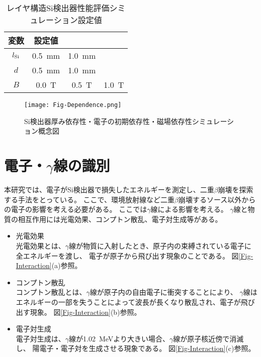 \documentclass[a4paper,10pt]{jreport}
\begin{document}
\begin{table}[H] 
	\center
	\caption{レイヤ構造Si検出器性能評価シミュレーション設定値} \label{Tab-Dpendence}
	\begin{tabular}{cccc}
		\hline
		変数 & 設定値  \\
		\hline
		$l_{\rm{Si}}$ &  \SI{0.5}{mm} & \SI{1.0}{mm} & \\
		$d$ & \SI{0.5}{mm} & \SI{1.0}{mm} & \\
		$B$ & \SI{0.0}{T} & \SI{0.5}{T} & \SI{1.0}{T} \\
		\hline
	\end{tabular}
\end{table}

\begin{figure}[H]
	\center
	\texttt{[image: Fig-Dependence.png]}
	\caption{Si検出器厚み依存性・電子の初期依存性・磁場依存性シミュレーション概念図} \label{Fig-Dependence}
\end{figure}



\section{電子・$\gamma$線の識別}

本研究では、電子がSi検出器で損失したエネルギーを測定し、二重$\beta$崩壊を探索する手法をとっている。
ここで、環境放射線など二重$\beta$崩壊するソース以外からの電子の影響を考える必要がある。
ここでは$\gamma$線による影響を考える。
$\gamma$線と物質の相互作用には光電効果、コンプトン散乱、電子対生成等がある。

\begin{itemize}
	\item 光電効果 \\
	光電効果とは、$\gamma$線が物質に入射したとき、原子内の束縛されている電子に全エネルギーを渡し、
	電子が原子から飛び出す現象のことである。
	図\ref{Fig-Interaction}(a)参照。
	
	\item コンプトン散乱 \\
	コンプトン散乱とは、$\gamma$線が原子内の自由電子に衝突することにより、
	$\gamma$線はエネルギーの一部を失うことによって波長が長くなり散乱され、電子が飛び出す現象。
	図\ref{Fig-Interaction}(b)参照。
	
	\item 電子対生成 \\
	電子対生成は、$\gamma$線が\SI{1.02}{MeV}より大きい場合、$\gamma$線が原子核近傍で消滅し、
	陽電子・電子対を生成させる現象である。
	図\ref{Fig-Interaction}(c)参照。
\end{itemize}
\end{document}
